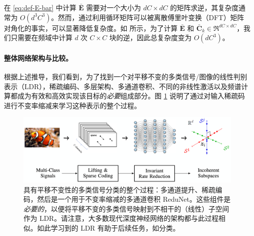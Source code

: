 \documentclass[../../book-main.tex]{subfiles}
\begin{document}
\begin{remark}[在频域中降低计算复杂性]
在 \eqref{eq:def-E-bar} 中计算 $\bar{\bm E}$ 需要对一个大小为 $dC \times dC$ 的矩阵求逆，其复杂度通常为 $O(d^3C^3)$。然而，通过利用循环矩阵可以被离散傅里叶变换（DFT）矩阵对角化的事实，可以显著降低复杂度。如 \cite{chan2021redunet} 所示，为了计算 $\bar{\bm E}$ 和 $\bar{\bm C}_k \in \Re^{dC \times dC}$，我们只需要在频域中计算 $d$ 次 $C\times C$ 块的逆，因此总复杂度变为 $O(dC^3)$。

\end{remark}




\paragraph{整体网络架构与比较。}
根据上述推导，我们看到，为了找到一个对平移不变的多类信号/图像的线性判别表示（LDR），稀疏编码、多层架构、多通道卷积、不同的非线性激活以及频谱计算都成为有效和高效实现该目标的{\em 必要}组成部分。图 \ref{fig:learn-to-classify-diagram} 说明了通过对输入稀疏码进行不变率缩减来学习这种表示的整个过程。

\begin{figure}[t]
    \centering
    \includegraphics[width=0.98\linewidth]{figs_chap4/learn_to_classify_diagram_updated.png}
    \caption{具有平移不变性的多类信号分类的整个过程：多通道提升、稀疏编码，然后是一个用于不变率缩减的多通道卷积 ReduNet。这些组件是{\em 必要的}，以便将平移不变的多类信号映射到不相干的（线性）子空间作为 LDR。请注意，大多数现代深度神经网络的架构都与此过程相似。如此学习到的 LDR 有助于后续任务，如分类。}
    \label{fig:learn-to-classify-diagram}
\end{figure}

\end{document}
